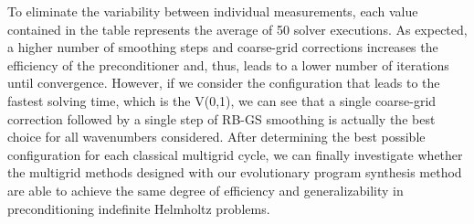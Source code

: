 To eliminate the variability between individual measurements, each value contained in the table represents the average of 50 solver executions.
As expected, a higher number of smoothing steps and coarse-grid corrections increases the efficiency of the preconditioner and, thus, leads to a lower number of iterations until convergence.
However, if we consider the configuration that leads to the fastest solving time, which is the V(0,1), we can see that a single coarse-grid correction followed by a single step of RB-GS smoothing is actually the best choice for all wavenumbers considered.
After determining the best possible configuration for each classical multigrid cycle, we can finally investigate whether the multigrid methods designed with our evolutionary program synthesis method are able to achieve the same degree of efficiency and generalizability in preconditioning indefinite Helmholtz problems.
